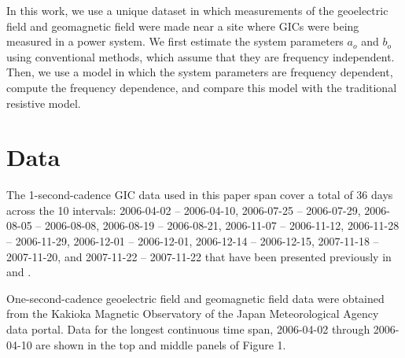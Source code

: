 \documentclass[draft,linenumbers]{agujournal2018}
\begin{document}
In this work, we use a unique dataset in which measurements of the geoelectric field and geomagnetic field were made near a site where GICs were being measured in a power system.  We first estimate the system parameters $a_o$ and $b_o$ using conventional methods, which assume that they are frequency independent.  Then, we use a model in which the system parameters are frequency dependent, compute the frequency dependence, and compare this model with the traditional resistive model. 

\section{Data}

The 1-second-cadence GIC data used in this paper span cover a total of 36 days across the 10 intervals: 2006-04-02 -- 2006-04-10, 2006-07-25 -- 2006-07-29, 2006-08-05 -- 2006-08-08, 2006-08-19 -- 2006-08-21, 2006-11-07 -- 2006-11-12, 2006-11-28 -- 2006-11-29, 2006-12-01 -- 2006-12-01, 2006-12-14 -- 2006-12-15, 2007-11-18 -- 2007-11-20, and 2007-11-22 -- 2007-11-22 that have been presented previously in \citet{Watari2009} and \cite{Watari2015}.

One-second-cadence geoelectric field and geomagnetic field data were obtained from the Kakioka Magnetic Observatory of the Japan Meteorological Agency data portal. Data for the longest continuous time span, 2006-04-02 through 2006-04-10 are shown in the top and middle panels of Figure 1.
\end{document}
